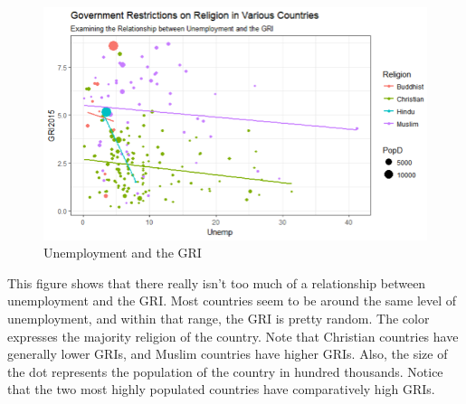 \documentclass{article}
\begin{document}
\begin{figure}[h!]
\centering
\includegraphics[scale=0.75]{PS6c_Nash}
\caption{Unemployment and the GRI}
\label{fig:PS6c_Nash}
\end{figure}

This figure shows that there really isn't too much of a relationship between unemployment and the GRI. Most countries seem to be around the same level of unemployment, and within that range, the GRI is pretty random. The color expresses the majority religion of the country. Note that Christian countries have generally lower GRIs, and Muslim countries have higher GRIs. Also, the size of the dot represents the population of the country in hundred thousands. Notice that the two most highly populated countries have comparatively high GRIs.
\end{document}
